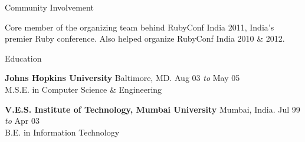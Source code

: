 \documentclass{resume} %
\begin{document}

\begin{rSection}{Community Involvement}

Core member of the organizing team behind RubyConf India 2011, India's
premier Ruby conference. Also helped organize RubyConf India 2010 \&
2012.
\end{rSection}



\begin{rSection}{Education}

{\bf Johns Hopkins University} \hfill Baltimore, MD. Aug 03 {\em to} May 05 \\ 
M.S.E. in Computer Science \& Engineering


{\bf V.E.S. Institute of Technology, Mumbai University} \hfill Mumbai, India. Jul 99 {\em to} Apr 03 \\ 
B.E. in Information Technology

\end{rSection}





\end{document}
